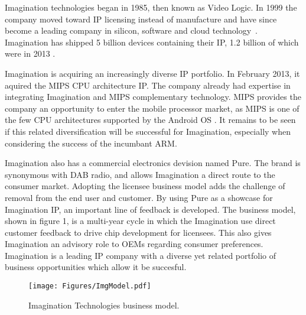 {}

Imagination technologies began in 1985, then known as Video Logic.
In 1999 the company moved toward IP licensing instead of manufacture and have since become a leading company in silicon, software and cloud technology~\cite{ImgHist}. Imagination has shipped 5 billion devices containing their IP, 1.2 billion of which were in 2013 \cite{ImgAnn13}.

Imagination is acquiring an increasingly diverse IP portfolio. In February 2013, it aquired the MIPS CPU architecture IP.
The company already had expertise in integrating Imagination and MIPS complementary technology.
MIPS provides the company an opportunity to enter the mobile processor market, as MIPS is one of the few CPU architectures supported by the Android OS \cite{ImgAnn13}. 
It remains to be seen if this related diversification will be successful for Imagination, especially when considering the success of the incumbant ARM.


Imagination also has a commercial electronics devision named Pure. 
The brand is synonymous with DAB radio, and allows Imagination a direct route to the consumer market.
Adopting the licensee business model adds the challenge of removal from the end user and customer.
By using Pure as a showcase for Imagination IP, an important line of feedback is developed.
The business model, shown in figure 1, is a multi-year cycle in which the Imagination use direct customer feedback to drive chip development for licensees.
This also gives Imagination an advisory role to OEMs regarding consumer preferences.
Imagination is a leading IP company with a diverse yet related portfolio of business opportunities which allow it be succesful.
 
\begin{figure}[!htb]
   \centering
   \texttt{[image: Figures/ImgModel.pdf]}
   \label{figure:ImgModel}
   \caption{Imagination Technologies business model.}
\end{figure}
